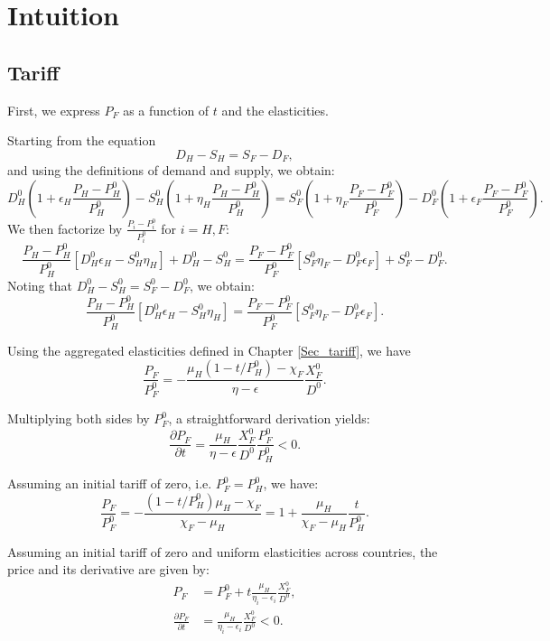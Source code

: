 \chapter{Intuition}\label{appendix:intuitions}

\section{Tariff}\label{appendix:intuitions_tariff}

First, we express $P_F$ as a function of $t$ and the elasticities.

Starting from the equation
$$
    D_H - S_H = S_F - D_F,
$$
and using the definitions of demand and supply, we obtain:
$$
    D_H^0\left(1+\epsilon_H \frac{P_H - P_H^0}{P_H^0}\right) - S_H^0\left(1+\eta_H \frac{P_H - P_H^0}{P_H^0}\right) = S_F^0 \left(1+\eta_F \frac{P_F - P_F^0}{P_F^0}\right) - D_F^0\left(1+\epsilon_F \frac{P_F - P_F^0}{P_F^0}\right).
$$
We then factorize by $\frac{P_i-P_i^0}{P_i^0}$ for $i = H,F$:
$$
    \frac{P_H - P_H^0}{P_H^0} [D_H^0 \epsilon_H - S_H^0 \eta_H] + D_H^0 - S_H^0 = \frac{P_F - P_F^0}{P_F^0} [S_F^0 \eta_F - D_F^0 \epsilon_F] + S_F^0 - D_F^0.
$$
Noting that $D_H^0 - S_H^0 = S_F^0 - D_F^0$, we obtain:
$$
    \frac{P_H - P_H^0}{P_H^0} [D_H^0 \epsilon_H - S_H^0 \eta_H] = \frac{P_F - P_F^0}{P_F^0} [S_F^0 \eta_F - D_F^0 \epsilon_F].
$$

Using the aggregated elasticities defined in Chapter \ref{Sec_tariff}, we have
$$
    \frac{P_F}{P_F^0}= -\frac{\mu_H (1 - t/P_H^0) - \chi_F}{\eta-\epsilon}\frac{X_F^0}{D^0}.
$$

Multiplying both sides by $P_F^0$, a straightforward derivation yields:
$$
    \frac{\partial P_F}{\partial t} = \frac{\mu_H}{\eta - \epsilon} \frac{X_F^0}{D^0} \frac{P_F^0}{P_H^0} < 0.
$$

Assuming an initial tariff of zero, i.e. $P_F^0 = P_H^0$, we have:
$$
    \frac{P_F}{P_F^0} = - \frac{(1 - t/P_H^0)\mu_H - \chi_F}{\chi_F - \mu_H} = 1+\frac{\mu_H}{\chi_F - \mu_H}\frac{t}{P_H^0}.
$$

Assuming an initial tariff of zero and uniform elasticities across countries, the price and its derivative are given by:
\begin{align*}
    P_F                             & = P_F^0 + t \frac{\mu_H}{\eta_i - \epsilon_i} \frac{X_F^0}{D^0}, \\
    \frac{\partial P_F}{\partial t} & = \frac{\mu_H}{\eta_i - \epsilon_i} \frac{X_F^0}{D^0} < 0.
\end{align*}

